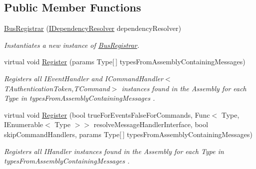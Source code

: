 \subsection*{Public Member Functions}
\begin{DoxyCompactItemize}
\item 
\hyperlink{classCqrs_1_1Configuration_1_1BusRegistrar_a4a934d21a535b28af6c67154512bba20_a4a934d21a535b28af6c67154512bba20}{Bus\+Registrar} (\hyperlink{interfaceCqrs_1_1Configuration_1_1IDependencyResolver}{I\+Dependency\+Resolver} dependency\+Resolver)
\begin{DoxyCompactList}\small\item\em Instantiates a new instance of \hyperlink{classCqrs_1_1Configuration_1_1BusRegistrar}{Bus\+Registrar}. \end{DoxyCompactList}\item 
virtual void \hyperlink{classCqrs_1_1Configuration_1_1BusRegistrar_ab8deb04dc9cb6b80f32b54c847dfb1b3_ab8deb04dc9cb6b80f32b54c847dfb1b3}{Register} (params Type\mbox{[}$\,$\mbox{]} types\+From\+Assembly\+Containing\+Messages)
\begin{DoxyCompactList}\small\item\em Registers all I\+Event\+Handler and I\+Command\+Handler$<$\+T\+Authentication\+Token,\+T\+Command$>$ instances found in the Assembly for each Type in {\itshape types\+From\+Assembly\+Containing\+Messages} . \end{DoxyCompactList}\item 
virtual void \hyperlink{classCqrs_1_1Configuration_1_1BusRegistrar_abc3af2b8dfeeb49f5e5461456ae01f67_abc3af2b8dfeeb49f5e5461456ae01f67}{Register} (bool true\+For\+Events\+False\+For\+Commands, Func$<$ Type, I\+Enumerable$<$ Type $>$$>$ resolve\+Message\+Handler\+Interface, bool skip\+Command\+Handlers, params Type\mbox{[}$\,$\mbox{]} types\+From\+Assembly\+Containing\+Messages)
\begin{DoxyCompactList}\small\item\em Registers all I\+Handler instances found in the Assembly for each Type in {\itshape types\+From\+Assembly\+Containing\+Messages} . \end{DoxyCompactList}\end{DoxyCompactItemize}
